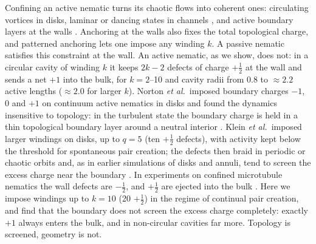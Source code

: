 \documentclass[aps,prl,twocolumn,superscriptaddress,amsmath,amssymb,reprint]{revtex4-2}
\newcommand{\half}{\tfrac12}
\begin{document}
Confining an active nematic turns its chaotic flows into coherent ones: circulating vortices in disks, laminar or dancing states in channels
\cite{Doostmohammadi2018,Theillard2017,Opathalage2019,Shendruk2017,Hardouin2019}, and active boundary layers at the walls \cite{Hardouin2022}. Anchoring at the walls also fixes the total topological charge, and patterned anchoring lets one impose any winding $k$.
A passive nematic satisfies this constraint at the wall. An active nematic, as we show, does not: in a circular cavity of winding $k$ it keeps
$2k-2$ defects of charge $+\half$ at the wall and sends a net $+1$ into the bulk, for $k=2$--10 and cavity radii from $0.8$ to $\approx2.2$ active lengths ($\approx2.0$ for larger $k$).
Norton \emph{et al.}\ imposed boundary charges $-1$, 0 and $+1$ on continuum active nematics in disks and found the dynamics insensitive to topology: in the
turbulent state the boundary charge is held in a thin topological boundary layer around a neutral interior \cite{Norton2018}. Klein \emph{et al.}\ imposed larger
windings on disks, up to $q=5$ (ten $+\half$ defects), with activity kept below the threshold for spontaneous pair creation; the defects then braid in periodic or chaotic
orbits and, as in earlier simulations of disks and annuli, tend to screen the excess charge near the boundary \cite{Klein2026}. In experiments on confined
microtubule nematics the wall defects are $-\half$, and $+\half$ are ejected into the bulk \cite{Hardouin2022}. Here we impose windings up to $k=10$ (20 $+\half$)
in the regime of continual pair creation, and find that the boundary does not screen the excess charge completely: exactly $+1$ always enters the bulk, and in
non-circular cavities far more. Topology is screened, geometry is not.
\end{document}
